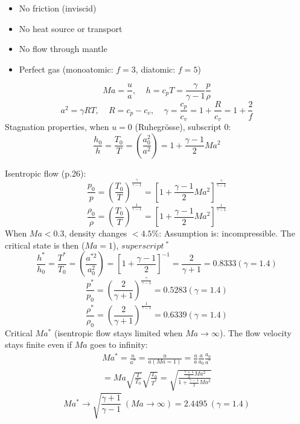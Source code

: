 \documentclass[8pt, landscape, fleqn]{scrartcl}
\begin{document}
\begin{multicols*}{3}
\begin{itemize}
    \item No friction (inviscid)
    \item No heat source or transport
    \item No flow through mantle
    \item Perfect gas (monoatomic: $f=3$, diatomic: $f=5$)
\end{itemize}
\begin{equation*}
    Ma = \frac{u}{a}, ~~~~~ h=c_p T = \frac{\gamma}{\gamma-1} \frac{p}{\rho}
\end{equation*}
\begin{equation*}
    a^2 = \gamma R T, ~~~~~ R = c_p - c_v, ~~~~~ \gamma = \frac{c_p}{c_v} = 1 + \frac{R}{c_v} = 1 + \frac{2}{f}
\end{equation*}
Stagnation properties, when $u=0$ (Ruhegrösse), subscript 0: 
\begin{equation*}
    \frac{h_0}{h} = \frac{T_0}{T} = \left( \frac{a_0^2}{a^2}\right) = 1 + \frac{\gamma - 1}{2} Ma^2
\end{equation*}

Isentropic flow (p.26):
\begin{equation*}
    \frac{p_0}{p} = \left( \frac{T_0}{T}\right)^{\frac{\gamma}{\gamma -1}} = \left[ 1 + \frac{\gamma-1}{2} Ma^2 \right]^{\frac{\gamma}{\gamma-1}}
\end{equation*}
\begin{equation*}
    \frac{\rho_0}{\rho} = \left( \frac{T_0}{T} \right)^{\frac{1}{\gamma-1}} = \left[ 1 + \frac{\gamma-1}{2} Ma^2 \right]^{\frac{1}{\gamma-1}}
\end{equation*}
When $Ma < 0.3$, density changes $< 4.5 \%$: Assumption is: incompressible. The critical state is then ($Ma = 1$), $superscript~^*$
\begin{equation*}
    \frac{h^*}{h_0} = \frac{T^*}{T_0} = \left( \frac{a^{*2}}{a_0^2}\right) = \left[ 1 + \frac{\gamma -1 }{2}\right]^{-1} = \frac{2}{\gamma+1} = 0.8333 (\gamma = 1.4)
\end{equation*}
\begin{equation*}
    \frac{p^*}{p_0} = \left( \frac{2}{\gamma+1} \right)^{\frac{\gamma}{\gamma-1}} = 0.5283 (\gamma = 1.4)
\end{equation*}
\begin{equation*}
    \frac{\rho^*}{\rho_0} = \left( \frac{2}{\gamma+1} \right)^{\frac{1}{\gamma-1}} = 0.6339 (\gamma = 1.4)
\end{equation*}
Critical $Ma^*$ (isentropic flow stays limited when $Ma \rightarrow \infty$). The flow velocity stays finite even if $Ma$ goes to infinity:
\begin{align*}
    Ma^* = \frac{u}{a^*} = \frac{u}{a(Ma=1)} = \frac{u}{a}\frac{a}{a_0}\frac{a_0}{a^*} \\
    = Ma \sqrt{\frac{T}{T_0}}\sqrt{\frac{T_0}{T^*}} = \sqrt{\frac{\frac{\gamma+1}{2}Ma^2}{1+\frac{\gamma-1}{2}Ma^2}}
\end{align*}
\begin{equation*}
    Ma^* \rightarrow \sqrt{\frac{\gamma+1}{\gamma-1}}~(Ma \rightarrow \infty) = 2.4495~(\gamma = 1.4)
\end{equation*}


\end{multicols*}
\end{document}
